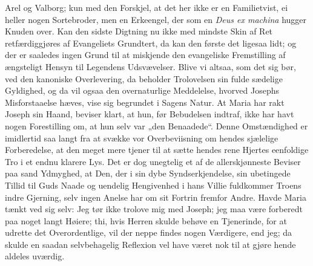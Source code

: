 \documentclass[12pt,a4paper]{book}
\begin{document}
{%
Arel og Valborg; kun med den Forskjel, at det her ikke er en Familietvist, ei
heller nogen Sortebroder, men en Erkeengel, der som en
\textit{Deus ex machina} hugger Knuden over. Kan den sidste Digtning nu ikke med
mindste Skin af Ret retfærdiggjøres af Evangeliets
Grundtert, da kan den første det ligesaa lidt; og der er saaledes ingen Grund
til at miskjende den evangeliske Fremstilling af ængsteligt Hensyn til Legendens
Udsvævelser. Blive vi altsaa, som det sig bør, ved den kanoniske Overlevering,
da beholder Trolovelsen sin fulde sædelige Gyldighed, og da vil ogsaa den
overnaturlige Meddelelse, hvorved Josephs Misforstaaelse hæves, vise sig
begrundet i Sagens Natur. At Maria har rakt Joseph sin Haand, beviser klart, at
hun, før Bebudelsen indtraf, ikke har havt nogen Forestilling om, at hun selv
var „den Benaadede“. Denne Omstændighed er imidlertid saa langt fra at svække
vor Overbeviisning om hendes sjælelige Forberedelse, at den meget mere tjener
til at sætte hendes rene Hjertes eenfoldige Tro i et endnu klarere Lys. Det er
dog unegtelig et af de allerskjønneste Beviser paa sand Ydmyghed, at Den, der i
sin dybe Syndserkjendelse, sin ubetingede Tillid til Guds Naade og uendelig
Hengivenhed i hans Villie fuldkommer Troens indre Gjerning, selv ingen Anelse
har om sit Fortrin fremfor Andre. Havde Maria tænkt ved sig selv: Jeg tør ikke
trolove mig med Joseph; jeg maa være forberedt paa noget langt Høiere; thi, hvis
Herren skulde behøve en Tjenerinde, for at udrette det Overordentlige, vil der
neppe findes nogen Værdigere, end jeg; da skulde en saadan selvbehagelig
Reflexion vel have været nok til at gjøre hende aldeles uværdig.

}
\end{document}
